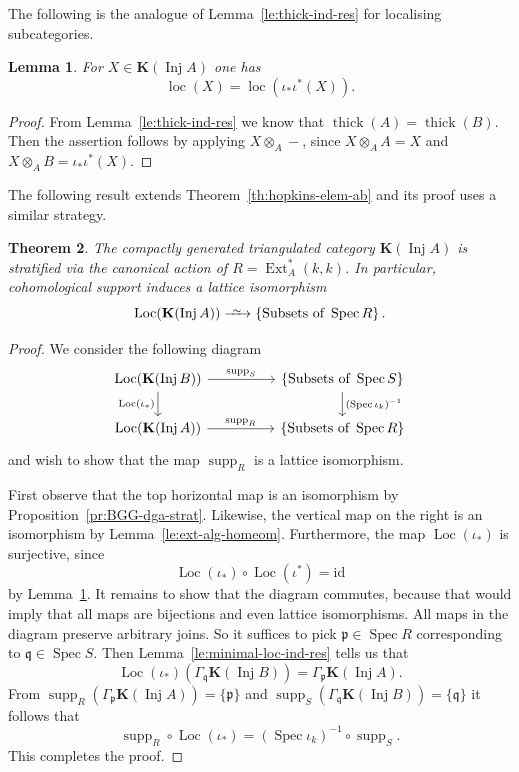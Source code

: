 \documentclass{amsart}[a4]
\newtheorem{theorem}{Theorem}[section]
\newtheorem{lemma}[theorem]{Lemma}
\theoremstyle{definition}
\theoremstyle{remark}
\numberwithin{equation}{section}
\newcommand{\Ext}{\operatorname{Ext}}
\newcommand{\Inj}{\operatorname{Inj}}
\newcommand{\loc}{\operatorname{loc}}
\newcommand{\Loc}{\operatorname{Loc}}
\newcommand{\Spec}{\operatorname{Spec}}
\newcommand{\supp}{\operatorname{supp}}
\newcommand{\thick}{\operatorname{thick}}
\newcommand{\longiso}{\xrightarrow{\
    \raisebox{-.6ex}[0ex][0ex]{$\scriptstyle{\sim}$}\ }}
\newcommand{\id}{\mathrm{id}}
\newcommand{\bfK}{\mathbf K}
\newcommand{\fp}{\mathfrak{p}}
\newcommand{\fq}{\mathfrak{q}}
\let\Gamma\varGamma
\begin{document}
The following is the analogue of Lemma~\ref{le:thick-ind-res} for
localising subcategories.

\begin{lemma}\label{le:loc-ind-res}
  For $X\in \bfK(\Inj A)$ one has \[\loc(X)=\loc(\iota_*\iota^*(X)).\]
\end{lemma}
\begin{proof}
  From Lemma~\ref{le:thick-ind-res} we know that
  $\thick(A)=\thick(B)$. Then the assertion follows by applying $X\otimes_A-$, since
  $X\otimes_AA=X$ and $X\otimes_AB=\iota_*\iota^*(X)$.
\end{proof}


The following result extends Theorem~\ref{th:hopkins-elem-ab} and its
proof uses a similar strategy.

\begin{theorem}\label{th:strat-elem-abelian}
  The compactly generated triangulated category $\bfK(\Inj A)$ is
  stratified via the canonical action of $R=\Ext_A^*(k,k)$. In
  particular, cohomological support induces a lattice isomorphism
  \begin{equation*}
    \Loc(\bfK(\Inj A))\longiso\{\text{Subsets of }\Spec
    R\}\,.
  \end{equation*}
\end{theorem}
\begin{proof}
  We consider the following diagram
\begin{equation*}
  \begin{tikzcd}
    \Loc(\bfK(\Inj B)) \ar[rr, "\supp_S"]\ar[d,swap,"\Loc(\iota_*)"]
    &&    \{\text{Subsets of }\Spec S\}\ar[d,"(\Spec \iota_k)^{-1}"]\\
    \Loc(\bfK(\Inj A)) \ar[rr,"\supp_R"] && \{\text{Subsets of }\Spec
    R\}
\end{tikzcd}
\end{equation*}
and wish to show that the map $\supp_R$ is a lattice isomorphism.

First observe that the top horizontal map is an isomorphism by
Proposition~\ref{pr:BGG-dga-strat}. Likewise, the vertical map on the
right is an isomorphism by Lemma~\ref{le:ext-alg-homeom}. Furthermore,
the map $\Loc(\iota_*)$ is surjective, since
\[\Loc(\iota_*)\circ \Loc(\iota^*)=\id\] by
Lemma~\ref{le:loc-ind-res}.  It remains to show that the diagram
commutes, because that would imply that all maps are bijections and
even lattice isomorphisms. All maps in the diagram preserve
arbitrary joins. So it suffices to pick $\fp\in\Spec R$ corresponding
to $\fq\in\Spec S$. Then Lemma~\ref{le:minimal-loc-ind-res} tells us that
\[\Loc(\iota_*)(\Gamma_\fq\bfK(\Inj B))=\Gamma_\fp\bfK(\Inj A).\]
From
$\supp_R(\Gamma_\fp\bfK(\Inj A))=\{\fp\}$ and
$\supp_S(\Gamma_\fq\bfK(\Inj B))=\{\fq\}$ it follows that
\[\supp_R\circ\Loc(\iota_*)=(\Spec \iota_k)^{-1}\circ\supp_S.\]
This completes the proof.
\end{proof}
\end{document}
